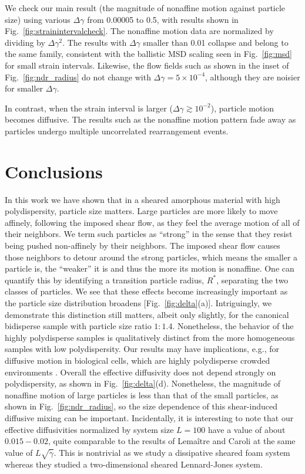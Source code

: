 \documentclass[%
 reprint,
 amsmath,amssymb,
 aps,
]{revtex4-2}
\begin{document}
We check our main result (the magnitude of nonaffine motion against particle size) using various $\Delta \gamma$ from 0.00005 to 0.5, with results shown in Fig.~\ref{fig:strainintervalcheck}.  The nonaffine motion data are normalized by dividing by $\Delta \gamma^2$.  The results with $\Delta \gamma$ smaller than 0.01 collapse and belong to the same family, consistent with the ballistic MSD scaling seen in Fig.~\ref{fig:msd} for small strain intervals.  Likewise, the flow fields such as shown in the inset of Fig.~\ref{fig:ndr_radius} do not change with $\Delta \gamma = 5 \times 10^{-4}$, although they are noisier for smaller $\Delta \gamma$.

In contrast, when the strain interval is larger ($\Delta \gamma \gtrsim 10^{-2}$), particle motion becomes diffusive.  The results such as the nonaffine motion pattern fade away as particles undergo multiple uncorrelated rearrangement events.



\section{Conclusions}

In this work we have shown that in a sheared amorphous material with high polydispersity, particle size matters.  Large particles are more likely to move affinely, following the imposed shear flow, as they feel the average motion of all of their neighbors. We term such particles as ``strong'' in the sense that they resist being pushed non-affinely by their neighbors.  The imposed shear flow causes those neighbors to detour around the strong particles, which means the smaller a particle is, the ``weaker'' it is and thus the more its motion is nonaffine. One can quantify this by identifying a transition particle radius, $R^*$, separating the two classes of particles. We see that these effects become increasingly important as the particle size distribution broadens  [Fig.~\ref{fig:delta}(a)]. Intriguingly, we demonstrate this distinction still matters, albeit only slightly, for the canonical bidisperse sample with particle size ratio $1:1.4$.  Nonetheless, the behavior of the highly polydisperse samples is qualitatively distinct from the more homogeneous samples with low polydispersity. Our results may have implications, e.g., for diffusive motion in biological cells, which are highly polydisperse crowded environments \cite{ridgway08}.  Overall the effective diffusivity does not depend strongly on polydispersity, as shown in Fig.~\ref{fig:delta}(d). Nonetheless, the magnitude of nonaffine motion of large particles is less than that of the small particles, as shown in Fig.~\ref{fig:ndr_radius}, so the size dependence of this shear-induced diffusive mixing can be important.  Incidentally, it is interesting to note that our effective diffusivities normalized by system size $L=100$ have a value of about $0.015 - 0.02$, quite comparable to the results of Lema{\^i}tre and Caroli \cite{lemaitre09} at the same value of $L \sqrt{\dot\gamma}$.  This is nontrivial as we study a dissipative sheared foam system whereas they studied a two-dimensional sheared Lennard-Jones system.
\end{document}
